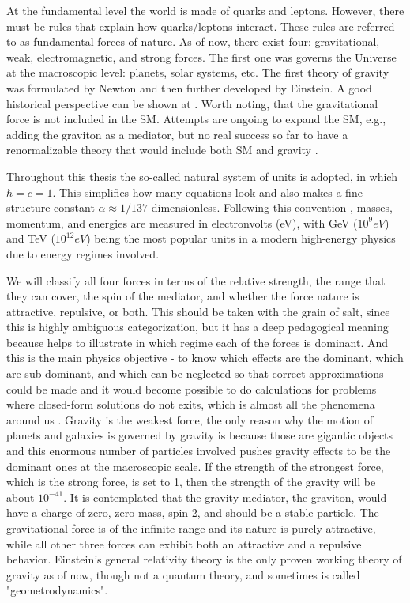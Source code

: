 At the fundamental level the world is made of quarks and leptons. However, there must be rules that explain how quarks/leptons interact. These rules are referred to as fundamental forces of nature. As of now, there exist four: gravitational, weak, electromagnetic, and strong forces. The first one was governs the Universe at the macroscopic level: planets, solar systems, etc. The first theory of gravity was formulated by Newton \cite{Chandrasekhar:1187874} and then further developed by Einstein. A good historical perspective can be shown at \cite{Gutfreund:1980674}. Worth noting, that the gravitational force is not included in the SM. Attempts are ongoing to expand the SM, e.g., adding the graviton as a mediator, but no real success so far to have a renormalizable theory that would include both SM and gravity \cite{butterworth2014smashing}. 

Throughout this thesis the so-called natural system of units is adopted, in which $\hbar = c = 1$. This simplifies how many equations look and also makes a fine-structure constant $\alpha \approx 1/137$ dimensionless.
Following this convention \cite{Cottingham:1026625}, masses, momentum, and energies are measured in electronvolts (eV), with GeV ($10^9 eV$) and TeV ($10^12 eV$) being the most popular units in a modern high-energy physics due to energy regimes involved.

We will classify all four forces \cite{wolfram} in terms of the relative strength, the range that they can cover, the spin of the mediator, and whether the force nature is attractive, repulsive, or both. This should be taken with the grain of salt, since this is highly ambiguous categorization, but it has a deep pedagogical meaning because helps to illustrate in which regime each of the forces is dominant. And this is the main physics objective - to know which effects are the dominant, which are sub-dominant, and which can be neglected so that correct approximations could be made and it would become possible to do calculations for problems where closed-form solutions do not exits, which is almost all the phenomena around us \cite{Bender}. Gravity is the weakest force, the only reason why the motion of planets and galaxies is governed by gravity is because those are gigantic objects and this enormous number of particles involved pushes gravity effects to be the dominant ones at the macroscopic scale. If the strength of the strongest force, which is the strong force, is set to 1, then the strength of the gravity will be about $10^{-41}$. It is contemplated that the gravity mediator, the graviton, would have a charge of zero, zero mass, spin 2, and should be a stable particle. The gravitational force is of the infinite range and its nature is purely attractive, while all other three forces can exhibit both an attractive and a repulsive behavior. Einstein's general relativity theory is the only proven working theory of gravity as of now, though not a quantum theory, and sometimes is called "geometrodynamics". 

